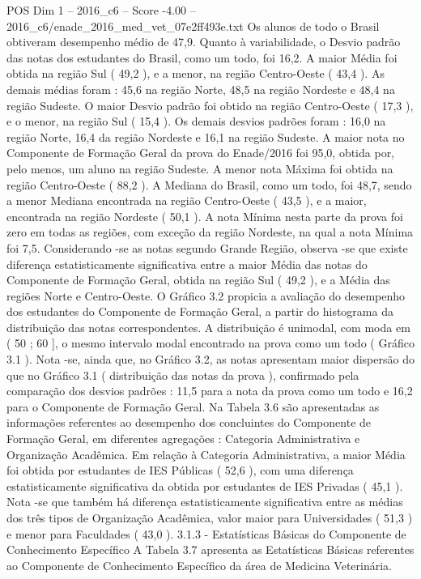 \begin{textsample}{POS Dim 1 – 2016\_c6 – Score -4.00 – 2016\_c6/enade\_2016\_med\_vet\_07e2ff493e.txt}
Os alunos de todo o Brasil obtiveram desempenho médio de 47,9.
Quanto à variabilidade, o Desvio padrão das notas dos estudantes do Brasil, como um todo, foi 16,2.
A maior Média foi obtida na região Sul ( 49,2 ), e a menor, na região Centro-Oeste ( 43,4 ).
As demais médias foram : 45,6 na região Norte, 48,5 na região Nordeste e 48,4 na região Sudeste.
O maior Desvio padrão foi obtido na região Centro-Oeste ( 17,3 ), e o menor, na região Sul ( 15,4 ).
Os demais desvios padrões foram : 16,0 na região Norte, 16,4 da região Nordeste e 16,1 na região Sudeste.
A maior nota no Componente de Formação Geral da prova do Enade/2016 foi 95,0, obtida por, pelo menos, um aluno na região Sudeste.
A menor nota Máxima foi obtida na região Centro-Oeste ( 88,2 ).
A Mediana do Brasil, como um todo, foi 48,7, sendo a menor Mediana encontrada na região Centro-Oeste ( 43,5 ), e a maior, encontrada na região Nordeste ( 50,1 ).
A nota Mínima nesta parte da prova foi zero em todas as regiões, com exceção da região Nordeste, na qual a nota Mínima foi 7,5.
Considerando -se as notas segundo Grande Região, observa -se que existe diferença estatisticamente significativa entre a maior Média das notas do Componente de Formação Geral, obtida na região Sul ( 49,2 ), e a Média das regiões Norte e Centro-Oeste.
O Gráfico 3.2 propicia a avaliação do desempenho dos estudantes do Componente de Formação Geral, a partir do histograma da distribuição das notas correspondentes.
A distribuição é unimodal, com moda em ( 50 ; 60 ], o mesmo intervalo modal encontrado na prova como um todo ( Gráfico 3.1 ).
Nota -se, ainda que, no Gráfico 3.2, as notas apresentam maior dispersão do que no Gráfico 3.1 ( distribuição das notas da prova ), confirmado pela comparação dos desvios padrões : 11,5 para a nota da prova como um todo e 16,2 para o Componente de Formação Geral.
Na Tabela 3.6 são apresentadas as informações referentes ao desempenho dos concluintes do Componente de Formação Geral, em diferentes agregações : Categoria Administrativa e Organização Acadêmica.
Em relação à Categoria Administrativa, a maior Média foi obtida por estudantes de IES Públicas ( 52,6 ), com uma diferença estatisticamente significativa da obtida por estudantes de IES Privadas ( 45,1 ).
Nota -se que também há diferença estatisticamente significativa entre as médias dos três tipos de Organização Acadêmica, valor maior para Universidades ( 51,3 ) e menor para Faculdades ( 43,0 ). 3.1.3 - Estatísticas Básicas do Componente de Conhecimento Específico A Tabela 3.7 apresenta as Estatísticas Básicas referentes ao Componente de Conhecimento Específico da área de Medicina Veterinária.

\end{textsample}
